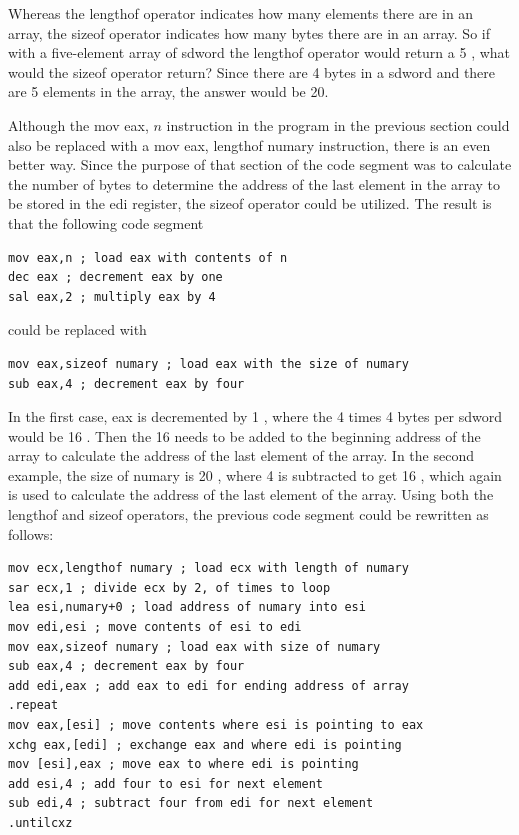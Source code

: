 \documentclass[10pt]{book}
\begin{document}
Whereas the lengthof operator indicates how many elements there are in an array, the sizeof operator indicates how many bytes there are in an array. So if with a five-element array of sdword the lengthof operator would return a 5 , what would the sizeof operator return? Since there are 4 bytes in a sdword and there are 5 elements in the array, the answer would be 20.

Although the mov eax, $n$ instruction in the program in the previous section could also be replaced with a mov eax, lengthof numary instruction, there is an even better way. Since the purpose of that section of the code segment was to calculate the number of bytes to determine the address of the last element in the array to be stored in the edi register, the sizeof operator could be utilized. The result is that the following code segment

\begin{verbatim}
mov eax,n ; load eax with contents of n
dec eax ; decrement eax by one
sal eax,2 ; multiply eax by 4
\end{verbatim}

could be replaced with

\begin{verbatim}
mov eax,sizeof numary ; load eax with the size of numary
sub eax,4 ; decrement eax by four
\end{verbatim}

In the first case, eax is decremented by 1 , where the 4 times 4 bytes per sdword would be 16 . Then the 16 needs to be added to the beginning address of the array to calculate the address of the last element of the array. In the second example, the size of numary is 20 , where 4 is subtracted to get 16 , which again is used to calculate the address of the last element of the array. Using both the lengthof and sizeof operators, the previous code segment could be rewritten as follows:


\begin{verbatim}
mov ecx,lengthof numary ; load ecx with length of numary
sar ecx,1 ; divide ecx by 2, of times to loop
lea esi,numary+0 ; load address of numary into esi
mov edi,esi ; move contents of esi to edi
mov eax,sizeof numary ; load eax with size of numary
sub eax,4 ; decrement eax by four
add edi,eax ; add eax to edi for ending address of array
.repeat
mov eax,[esi] ; move contents where esi is pointing to eax
xchg eax,[edi] ; exchange eax and where edi is pointing
mov [esi],eax ; move eax to where edi is pointing
add esi,4 ; add four to esi for next element
sub edi,4 ; subtract four from edi for next element
.untilcxz
\end{verbatim}
\end{document}

